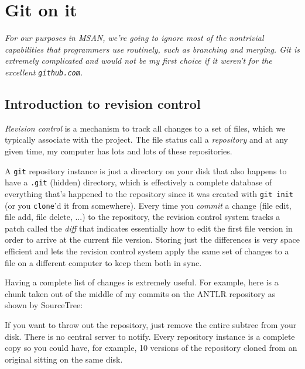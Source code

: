 \chapter{Git on it}

\begin{fullwidth}

{\em\small For our purposes in MSAN, we're going to ignore most of the nontrivial capabilities that programmers use routinely, such as branching and merging. Git is extremely  complicated and would not be my first choice if it weren't for the excellent {\tt github.com}.}

\section{Introduction to revision control}


{\em Revision control} is a mechanism to track all changes to a set of files, which we typically associate with the project. The file status call a {\em repository} and at any given time, my computer has lots and lots of these repositories. 

A {\tt git} repository instance is just a directory on your disk that also happens to have a {\tt .git} (hidden) directory, which is effectively a complete database of everything that's happened to the repository since it was created with {\tt git init} (or you {\tt clone}'d it from somewhere). Every time you {\em commit} a change (file edit, file add, file delete, ...) to the repository, the revision control system tracks a patch called the {\em diff} that indicates essentially how to edit the first file version in order to arrive at the current file version. Storing just the differences is very space efficient and  lets the revision control system apply the same set of changes to a file on a different computer to keep them both in sync.  

Having a complete list of changes is extremely useful. For example, here is a chunk taken out of the middle of my commits on the ANTLR repository as shown by SourceTree:


If you want to throw out the repository, just remove the entire subtree from your disk. There is no central server to notify. Every repository instance is a complete copy so you could have, for example, 10 versions of the repository cloned from an original sitting on the same disk.


\end{fullwidth}
